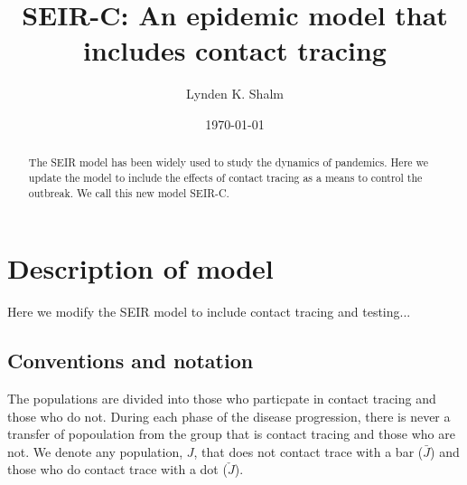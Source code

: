 \documentclass[notitlepage, superscriptaddress]{revtex4-2}
\begin{document}
\title{SEIR-C: An epidemic model that includes contact tracing}

\author{Lynden K. Shalm}



\begin{abstract}
The SEIR model has been widely used to study the dynamics of pandemics. Here we update the model to include the effects of contact tracing as a means to control the outbreak. We call this new model SEIR-C.
\end{abstract}
\date{\today}
\maketitle


\section{Description of model}
Here we modify the SEIR model to include contact tracing and testing...

\subsection{Conventions and notation}
The populations are divided into those who particpate in contact tracing and those who do not. During each phase of the disease progression, there is never a transfer of popoulation from the group that is contact tracing and those who are not. We denote any population, $J$, that does not contact trace with a bar ($\bar{J}$) and those who do contact trace with a dot ($\check{J}$). 
\end{document}
